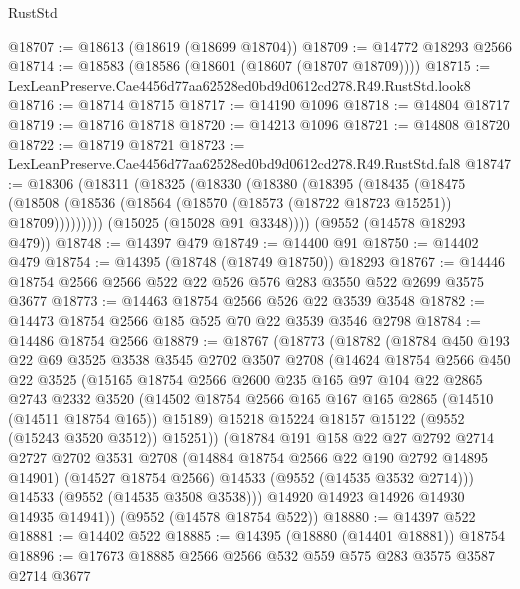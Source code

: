 \begin{lexlean}{RustStd}
\begin{coremodule}
@18707 := @18613 (@18619 (@18699 @18704))
@18709 := @14772 @18293 @2566
@18714 := @18583 (@18586 (@18601 (@18607 (@18707 @18709))))
@18715 := LexLeanPreserve.Cae4456d77aa62528ed0bd9d0612cd278.R49.RustStd.look8
@18716 := @18714 @18715
@18717 := @14190 @1096
@18718 := @14804 @18717
@18719 := @18716 @18718
@18720 := @14213 @1096
@18721 := @14808 @18720
@18722 := @18719 @18721
@18723 := LexLeanPreserve.Cae4456d77aa62528ed0bd9d0612cd278.R49.RustStd.fal8
@18747 := @18306
    (@18311
      (@18325
        (@18330
          (@18380
            (@18395
              (@18435
                (@18475
                  (@18508 (@18536 (@18564 (@18570 (@18573 (@18722 @18723 @15251)) @18709)))))))))
        (@15025 (@15028 @91 @3348))))
    (@9552 (@14578 @18293 @479))
@18748 := @14397 @479
@18749 := @14400 @91
@18750 := @14402 @479
@18754 := @14395 (@18748 (@18749 @18750)) @18293
@18767 := @14446 @18754 @2566 @2566 @522 @22 @526 @576 @283 @3550 @522 @2699 @3575 @3677
@18773 := @14463 @18754 @2566 @526 @22 @3539 @3548
@18782 := @14473 @18754 @2566 @185 @525 @70 @22 @3539 @3546 @2798
@18784 := @14486 @18754 @2566
@18879 := @18767
    (@18773
      (@18782
        (@18784
          @450
          @193
          @22
          @69
          @3525
          @3538
          @3545
          @2702
          @3507
          @2708
          (@14624
            @18754
            @2566
            @450
            @22
            @3525
            (@15165
              @18754
              @2566
              @2600
              @235
              @165
              @97
              @104
              @22
              @2865
              @2743
              @2332
              @3520
              (@14502 @18754 @2566 @165 @167 @165 @2865 (@14510 (@14511 @18754 @165)) @15189)
              @15218
              @15224
              @18157
              @15122
              (@9552 (@15243 @3520 @3512))
              @15251))
          (@18784
            @191
            @158
            @22
            @27
            @2792
            @2714
            @2727
            @2702
            @3531
            @2708
            (@14884 @18754 @2566 @22 @190 @2792 @14895 @14901)
            (@14527 @18754 @2566)
            @14533
            (@9552 (@14535 @3532 @2714)))
          @14533
          (@9552 (@14535 @3508 @3538)))
        @14920
        @14923
        @14926
        @14930
        @14935
        @14941))
    (@9552 (@14578 @18754 @522))
@18880 := @14397 @522
@18881 := @14402 @522
@18885 := @14395 (@18880 (@14401 @18881)) @18754
@18896 := @17673 @18885 @2566 @2566 @532 @559 @575 @283 @3575 @3587 @2714 @3677

\end{coremodule}
\end{lexlean}
